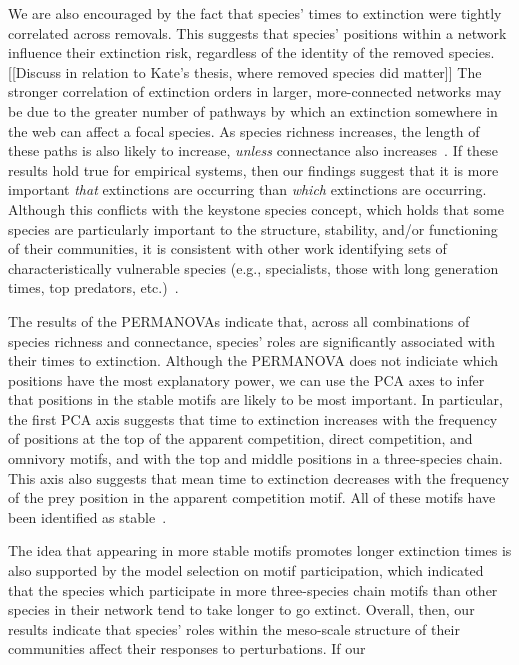 \documentclass[12pt]{article}
\begin{document}
 
	We are also encouraged by the fact that species' times to extinction were tightly correlated across removals. This suggests that species' positions within a network influence their extinction risk, regardless of the identity of the removed species.  [[Discuss in relation to Kate's thesis, where removed species did matter]] The stronger correlation of extinction orders in larger, more-connected networks may be due to the greater number of pathways by which an extinction somewhere in the web can affect a focal species. As species richness increases, the length of these paths is also likely to increase, \emph{unless} connectance also increases~\citep{}. If these results hold true for empirical systems, then our findings suggest that it is more important \emph{that} extinctions are occurring than \emph{which} extinctions are occurring. Although this conflicts with the keystone species concept, which holds that some species are particularly important to the structure, stability, and/or functioning of their communities, it is consistent with other work identifying sets of characteristically vulnerable species (e.g., specialists, those with long generation times, top predators, etc.)~\citep{}.


	The results of the PERMANOVAs indicate that, across all combinations of species richness and connectance, species' roles are significantly associated with their times to extinction. Although the PERMANOVA does not indiciate which positions have the most explanatory power, we can use the PCA axes to infer that positions in the stable motifs are likely to be most important. In particular, the first PCA axis suggests that time to extinction increases with the frequency of positions at the top of the apparent competition, direct competition, and omnivory motifs, and with the top and middle positions in a three-species chain. This axis also suggests that mean time to extinction decreases with the frequency of the prey position in the apparent competition motif. All of these motifs have been identified as stable~\citep{Stouffer2007,Borrelli2015a}.

	
	The idea that appearing in more stable motifs promotes longer extinction times is also supported by the model selection on motif participation, which indicated that the species which participate in more three-species chain motifs than other species in their network tend to take longer to go extinct. Overall, then, our results indicate that species' roles within the meso-scale structure of their communities affect their responses to perturbations. If our 
\end{document}
